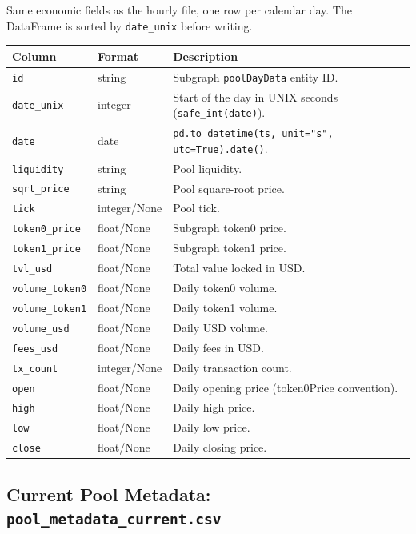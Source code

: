 \documentclass[11pt,a4paper]{article}
\begin{document}
Same economic fields as the hourly file, one row per calendar day.
The DataFrame is sorted by \texttt{date\_unix} before writing.

\begin{xltabular}{\linewidth}{L{4.2cm}L{3.0cm}Y}
\toprule
\textbf{Column} & \textbf{Format} & \textbf{Description} \\
\midrule
\texttt{id} & string & Subgraph \texttt{poolDayData} entity ID. \\
\texttt{date\_unix} & integer & Start of the day in UNIX seconds
  (\texttt{safe\_int(date)}). \\
\texttt{date} & date & \texttt{pd.to\_datetime(ts, unit="s",
  utc=True).date()}. \\
\texttt{liquidity} & string & Pool liquidity. \\
\texttt{sqrt\_price} & string & Pool square-root price. \\
\texttt{tick} & integer/None & Pool tick. \\
\texttt{token0\_price} & float/None & Subgraph token0 price. \\
\texttt{token1\_price} & float/None & Subgraph token1 price. \\
\texttt{tvl\_usd} & float/None & Total value locked in USD. \\
\texttt{volume\_token0} & float/None & Daily token0 volume. \\
\texttt{volume\_token1} & float/None & Daily token1 volume. \\
\texttt{volume\_usd} & float/None & Daily USD volume. \\
\texttt{fees\_usd} & float/None & Daily fees in USD. \\
\texttt{tx\_count} & integer/None & Daily transaction count. \\
\texttt{open} & float/None & Daily opening price (token0Price convention). \\
\texttt{high} & float/None & Daily high price. \\
\texttt{low} & float/None & Daily low price. \\
\texttt{close} & float/None & Daily closing price. \\
\bottomrule
\end{xltabular}

\subsection{Current Pool Metadata: \texttt{pool\_metadata\_current.csv}}
\end{document}
